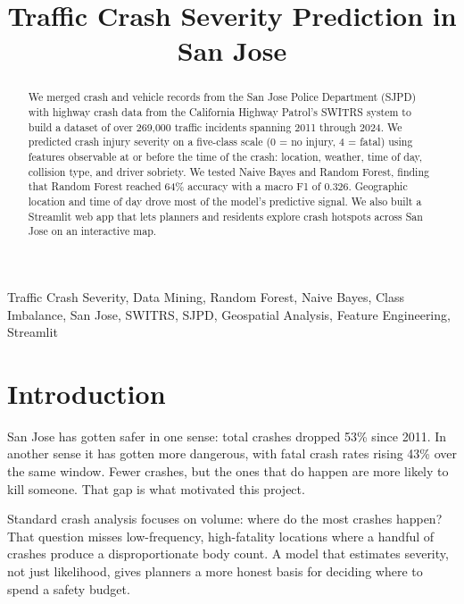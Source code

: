 \documentclass[conference]{IEEEtran}
\begin{document}
\title{Traffic Crash Severity Prediction in San Jose}

\author{
}

\maketitle

\begin{abstract}
We merged crash and vehicle records from the San Jose Police Department (SJPD) with highway crash data from the California Highway Patrol's SWITRS system to build a dataset of over 269,000 traffic incidents spanning 2011 through 2024. We predicted crash injury severity on a five-class scale (0 = no injury, 4 = fatal) using features observable at or before the time of the crash: location, weather, time of day, collision type, and driver sobriety. We tested Naive Bayes and Random Forest, finding that Random Forest reached 64\% accuracy with a macro F1 of 0.326. Geographic location and time of day drove most of the model's predictive signal. We also built a Streamlit web app that lets planners and residents explore crash hotspots across San Jose on an interactive map.
\end{abstract}

\begin{IEEEkeywords}
Traffic Crash Severity, Data Mining, Random Forest, Naive Bayes, Class Imbalance, San Jose, SWITRS, SJPD, Geospatial Analysis, Feature Engineering, Streamlit
\end{IEEEkeywords}

\section{Introduction}

San Jose has gotten safer in one sense: total crashes dropped 53\% since 2011. In another sense it has gotten more dangerous, with fatal crash rates rising 43\% over the same window. Fewer crashes, but the ones that do happen are more likely to kill someone. That gap is what motivated this project.

Standard crash analysis focuses on volume: where do the most crashes happen? That question misses low-frequency, high-fatality locations where a handful of crashes produce a disproportionate body count. A model that estimates severity, not just likelihood, gives planners a more honest basis for deciding where to spend a safety budget.
\end{document}
